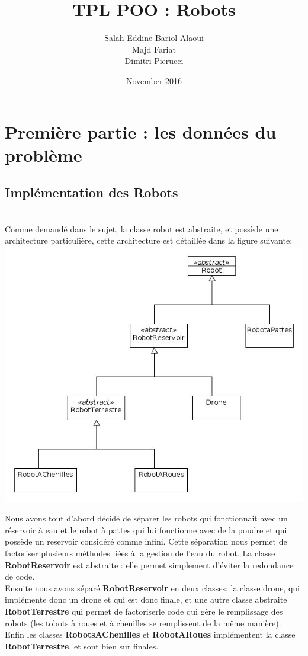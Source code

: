 \documentclass{article}
\title{TPL POO : Robots}
\author{Salah-Eddine Bariol Alaoui\\Majd Fariat\\Dimitri Pierucci}
\date{November 2016}
\begin{document}
\maketitle

\section{Première partie : les données du problème}

\subsection{Implémentation des Robots} \\

Comme demandé dans le sujet, la classe robot est abstraite, et possède une architecture particulière, cette architecture est détaillée dans la figure suivante: \\

\includegraphics[scale=0.5]{UML-Robot.jpg} 

\noindent Nous avons tout d'abord décidé de séparer les robots qui fonctionnait avec un réservoir à eau et le robot à pattes qui lui fonctionne avec de la poudre et qui possède un reservoir considéré comme infini. Cette séparation nous permet de factoriser plusieurs méthodes liées à la gestion de l'eau du robot. La classe \textbf{RobotReservoir} est abstraite : elle permet simplement d'éviter la redondance de code. \\
Ensuite nous avons séparé \textbf{RobotReservoir} en deux classes: la classe drone, qui implémente donc un drone et qui est donc finale, et une autre classe abstraite \textbf{RobotTerrestre} qui permet de factoriserle code qui gère le remplissage des robots (les tobots à roues et à chenilles se remplissent de la même manière). Enfin les classes \textbf{RobotsAChenilles} et \textbf{RobotARoues} implémentent la classe \textbf{RobotTerrestre}, et sont bien sur finales. 
\end{document}
